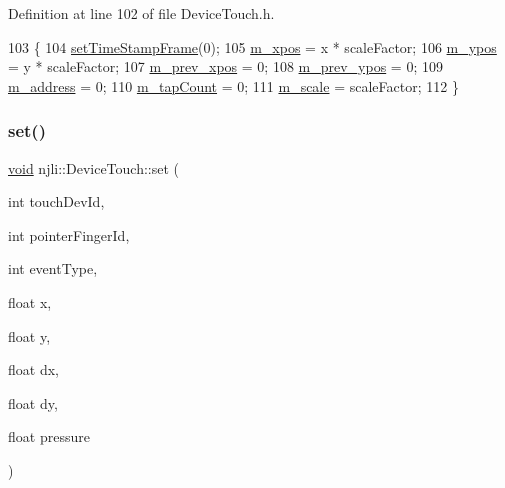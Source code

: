 Definition at line 102 of file Device\+Touch.\+h.


\begin{DoxyCode}
103     \{
104       \mbox{\hyperlink{classnjli_1_1_device_input_time_a03eca1e2b0725a5be925f6ec5cd33b7b}{setTimeStampFrame}}(0);
105       \mbox{\hyperlink{classnjli_1_1_device_touch_aa459469f52287f2085402117c13512f8}{m\_xpos}} = x * scaleFactor;
106       \mbox{\hyperlink{classnjli_1_1_device_touch_aec3c40c2adb1ba1bf5a13bf366bd3b6d}{m\_ypos}} = y * scaleFactor;
107       \mbox{\hyperlink{classnjli_1_1_device_touch_aefd5c83cec6edc7dcb7edeec2144c470}{m\_prev\_xpos}} = 0;
108       \mbox{\hyperlink{classnjli_1_1_device_touch_adc6f1bce3fa81e81f1a01ca55b2b3db7}{m\_prev\_ypos}} = 0;
109       \mbox{\hyperlink{classnjli_1_1_device_touch_adf8b9a7a96b90d0639aca0b9982a95d7}{m\_address}} = 0;
110       \mbox{\hyperlink{classnjli_1_1_device_touch_af4506b66dcc8e44597244c9a6827bd0d}{m\_tapCount}} = 0;
111       \mbox{\hyperlink{classnjli_1_1_device_touch_ae07cde00eac9eb6e816f261bdb0df9d4}{m\_scale}} = scaleFactor;
112     \}
\end{DoxyCode}
\mbox{\label{classnjli_1_1_device_touch_a919bb88be34601d01c19c452bd3fae8b}} 
\subsubsection{\texorpdfstring{set()}{set()}\hspace{0.1cm}{\footnotesize\ttfamily [3/4]}}
{\footnotesize\ttfamily \mbox{\hyperlink{_thread_8h_af1e856da2e658414cb2456cb6f7ebc66}{void}} njli\+::\+Device\+Touch\+::set (\begin{DoxyParamCaption}\item[{int}]{touch\+Dev\+Id,  }\item[{int}]{pointer\+Finger\+Id,  }\item[{int}]{event\+Type,  }\item[{float}]{x,  }\item[{float}]{y,  }\item[{float}]{dx,  }\item[{float}]{dy,  }\item[{float}]{pressure }\end{DoxyParamCaption})\hspace{0.3cm}{\ttfamily [inline]}}



